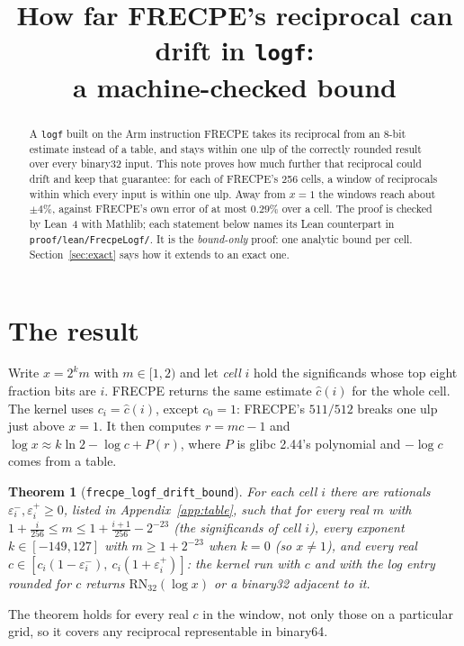 \documentclass[11pt]{article}
\title{How far FRECPE's reciprocal can drift in \texttt{logf}:\\
a machine-checked bound}
\author{}
\date{}
\newtheorem{theorem}{Theorem}
\newcommand{\lean}[1]{{\small\texttt{#1}}}
\newcommand{\RN}{\mathrm{RN}}
\begin{document}
\maketitle

\begin{abstract}
A \texttt{logf} built on the Arm instruction FRECPE takes its reciprocal from an
8-bit estimate instead of a table, and stays within one ulp of the correctly
rounded result over every binary32 input. This note proves how much further that
reciprocal could drift and keep that guarantee: for each of FRECPE's 256 cells,
a window of reciprocals within which every input is within one ulp. Away from
$x = 1$ the windows reach about $\pm 4\%$, against FRECPE's own error of at most
$0.29\%$ over a cell. The proof is checked by Lean~4 with Mathlib; each statement below names
its Lean counterpart in \lean{proof/lean/FrecpeLogf/}. It is the \emph{bound-only}
proof: one analytic bound per cell. Section~\ref{sec:exact} says how it extends to
an exact one.
\end{abstract}

\section{The result}

Write $x = 2^k m$ with $m \in [1, 2)$ and let \emph{cell} $i$ hold the significands
whose top eight fraction bits are $i$. FRECPE returns the same estimate
$\hat c(i)$ for the whole cell. The kernel uses $c_i = \hat c(i)$, except
$c_0 = 1$: FRECPE's $511/512$ breaks one ulp just above $x = 1$. It then computes
$r = m c - 1$ and $\log x \approx k \ln 2 - \log c + P(r)$, where $P$ is glibc 2.44's
polynomial and $-\log c$ comes from a table.

\begin{theorem}[\lean{frecpe\_logf\_drift\_bound}]\label{thm:main}
For each cell $i$ there are rationals $\varepsilon^-_i, \varepsilon^+_i \ge 0$,
listed in Appendix~\ref{app:table}, such that for every real $m$ with
$1 + \tfrac{i}{256} \le m \le 1 + \tfrac{i+1}{256} - 2^{-23}$ (the significands of cell $i$),
every exponent $k \in [-149, 127]$ with $m \ge 1 + 2^{-23}$ when $k = 0$ (so $x \ne 1$),
and every real
$c \in [c_i(1 - \varepsilon^-_i),\ c_i(1 + \varepsilon^+_i)]$: the kernel run with $c$
and with the log entry rounded for $c$ returns $\RN_{32}(\log x)$ or a binary32
adjacent to it.
\end{theorem}

The theorem holds for every real $c$ in the window, not only those on a particular
grid, so it covers any reciprocal representable in binary64.
\end{document}
